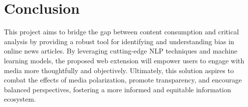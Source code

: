 \documentclass{article}
\begin{document}
\section{Conclusion}
This project aims to bridge the gap between content consumption and critical analysis by providing a robust tool for identifying and understanding bias in online news articles. By leveraging cutting-edge NLP techniques and machine learning models, the proposed web extension will empower users to engage with media more thoughtfully and objectively. Ultimately, this solution aspires to combat the effects of media polarization, promote transparency, and encourage balanced perspectives, fostering a more informed and equitable information ecosystem.

\nocite{*}
\printbibliography
\end{document}
